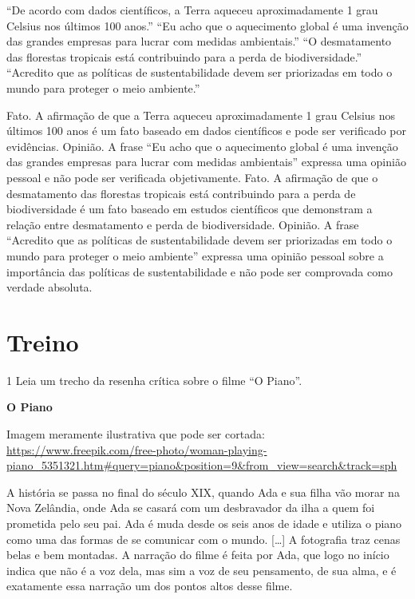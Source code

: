 \begin{itemize}
\begin{itemize}
``De acordo com dados científicos, a Terra aqueceu aproximadamente 1
grau Celsius nos últimos 100 anos.'' ``Eu acho que o aquecimento global
é uma invenção das grandes empresas para lucrar com medidas
ambientais.'' ``O desmatamento das florestas tropicais está contribuindo
para a perda de biodiversidade.'' ``Acredito que as políticas de
sustentabilidade devem ser priorizadas em todo o mundo para proteger o
meio ambiente.''


Fato. A afirmação de que a Terra aqueceu aproximadamente 1 grau Celsius
nos últimos 100 anos é um fato baseado em dados científicos e pode ser
verificado por evidências. Opinião. A frase ``Eu acho que o aquecimento
global é uma invenção das grandes empresas para lucrar com medidas
ambientais'' expressa uma opinião pessoal e não pode ser verificada
objetivamente. Fato. A afirmação de que o desmatamento das florestas
tropicais está contribuindo para a perda de biodiversidade é um fato
baseado em estudos científicos que demonstram a relação entre
desmatamento e perda de biodiversidade. Opinião. A frase ``Acredito que
as políticas de sustentabilidade devem ser priorizadas em todo o mundo
para proteger o meio ambiente'' expressa uma opinião pessoal sobre a
importância das políticas de sustentabilidade e não pode ser comprovada
como verdade absoluta.

\section{Treino}

\num{1} Leia um trecho da resenha crítica sobre o filme ``O Piano''.

\textbf{O Piano}

Imagem meramente ilustrativa que pode ser cortada:
\url{https://www.freepik.com/free-photo/woman-playing-piano_5351321.htm\#query=piano\&position=9\&from_view=search\&track=sph}

A história se passa no final do século XIX, quando Ada e sua filha vão
morar na Nova Zelândia, onde Ada se casará com um desbravador da ilha a
quem foi prometida pelo seu pai. Ada é muda desde os seis anos de idade
e utiliza o piano como uma das formas de se comunicar com o mundo.
{[}\ldots{}{]} A fotografia traz cenas belas e bem montadas. A narração
do filme é feita por Ada, que logo no início indica que não é a voz
dela, mas sim a voz de seu pensamento, de sua alma, e é exatamente essa
narração um dos pontos altos desse filme.


\end{itemize}
\end{itemize}
